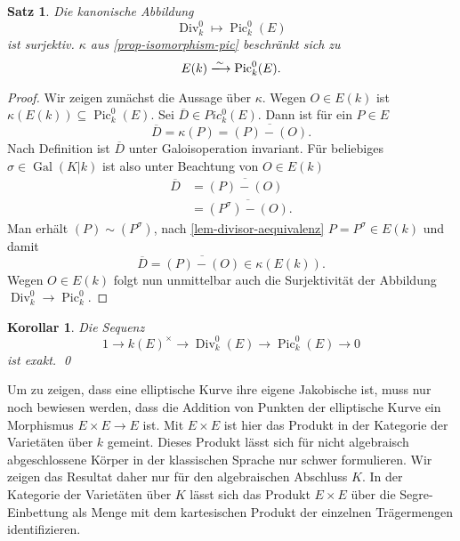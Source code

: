 \documentclass{amsart}
\theoremstyle{plain}
\newtheorem{proposition}[subsection]{Satz}
\newtheorem{corollary}[subsection]{Korollar}
\theoremstyle{definition}
\newcommand{\rightarrowiso}{\xlongrightarrow{\sim}}
\newcommand{\pic}{\operatorname{Pic}}
\newcommand{\divgrp}{\operatorname{Div}}
\newcommand{\coset}[1]{\overline{#1}}
\newcommand{\gal}{\operatorname{Gal}}
\begin{document}
\begin{proposition}
	Die kanonische Abbildung
	\begin{equation*}
		\divgrp_k^0 \mapsto \pic_k^0(E)
	\end{equation*}
	ist surjektiv. $\kappa$ aus \ref{prop-isomorphism-pic} beschränkt sich zu 
	\begin{equation*}
		E(k) \rightarrowiso \pic_k^0(E).
	\end{equation*}
\end{proposition}
\begin{proof}
	Wir zeigen zunächst die Aussage über $\kappa$.
	Wegen $O \in E(k)$ ist $\kappa(E(k)) \subseteq \pic_k^0(E)$.
	Sei $\coset{D} \in Pic_k^0(E)$. Dann ist für ein $P \in E$
	\begin{equation*}
		\coset{D} = \kappa(P) = \coset{(P) - (O)}.
	\end{equation*}
	Nach Definition ist $\coset{D}$ unter Galoisoperation invariant.
	Für beliebiges $\sigma \in \gal(K | k)$ ist also unter Beachtung von $O \in E(k)$
	\begin{align*}
		\coset{D} & = \coset{(P) - (O)} \\
		& = \coset{(P^{\sigma}) - (O)}.
	\end{align*}
	Man erhält $(P) \sim (P^{\sigma})$, nach \ref{lem-divisor-aequivalenz} $P = P^{\sigma} \in E(k)$ und damit
	\begin{equation*}
		\coset{D} = \coset{(P) - (O)} \in \kappa(E(k)).
	\end{equation*}
	Wegen $O \in E(k)$ folgt nun unmittelbar auch die Surjektivität der Abbildung $\divgrp_k^0 \rightarrow \pic_k^0$.
\end{proof}

\begin{corollary}
	Die Sequenz
	\begin{equation*}
		1 \rightarrow k(E)^{\times} \rightarrow \divgrp_k^0(E) \rightarrow \pic_k^0(E) \rightarrow 0
	\end{equation*}
	ist exakt.
	\qed
\end{corollary}


Um zu zeigen, dass eine elliptische Kurve ihre eigene Jakobische ist, muss nur noch bewiesen werden, dass die Addition von Punkten der elliptische Kurve ein Morphismus $E \times E \rightarrow E$ ist.
Mit $E \times E$ ist hier das Produkt in der Kategorie der Varietäten über $k$ gemeint.
Dieses Produkt lässt sich für nicht algebraisch abgeschlossene Körper in der klassischen Sprache nur schwer formulieren.
Wir zeigen das Resultat daher nur für den algebraischen Abschluss $K$.
In der Kategorie der Varietäten über $K$ lässt sich das Produkt $E \times E$ über die Segre-Einbettung als Menge mit dem kartesischen Produkt der einzelnen Trägermengen identifizieren.
\end{document}
